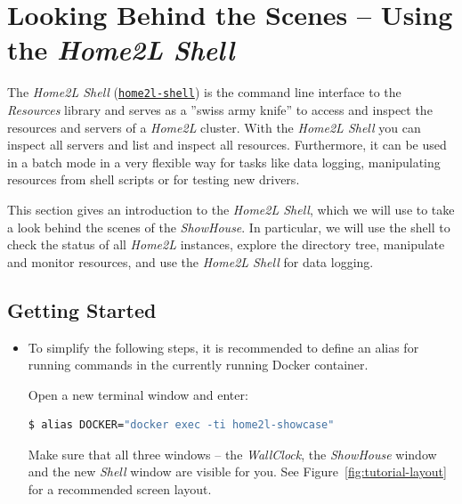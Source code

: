 \documentclass[12pt,english,parskip=half,headheight=19pt]{scrreprt}
\newcommand{\idx}[1]{#1\index{#1}}
\newcommand{\reftool}[1]{\hyperref[tool:#1]{\texttt{\idx{#1}}}}
\begin{document}
\clearpage
\section{Looking Behind the Scenes -- Using the \textit{Home2L Shell}}
\label{sec:tutorial-shell}


The \textit{Home2L Shell} (\reftool{home2l-shell}) is the command line interface to the \textit{Resources} library and serves as a ''swiss army knife'' to access and inspect the resources and servers of a \textit{Home2L} cluster. With the \textit{Home2L Shell} you can inspect all servers and list and inspect all resources. Furthermore, it can be used in a batch mode in a very flexible way for tasks like data logging, manipulating resources from shell scripts or for testing new drivers.

This section gives an introduction to the \textit{Home2L Shell}, which we will use to take a look behind the scenes of the \textit{ShowHouse}. In particular, we will use the shell to check the status of all \textit{Home2L} instances, explore the directory tree, manipulate and monitor resources, and use the \textit{Home2L Shell} for data logging.





\subsection{Getting Started}
\label{sec:tutorial-shell-start}



\begin{itemize}[$\blacktriangleright$]

\item
  To simplify the following steps, it is recommended to define an alias for running
  commands in the currently running Docker container.
  
  Open a new terminal window and enter:
  \begin{lstlisting}[language=bash]
    $ alias DOCKER="docker exec -ti home2l-showcase"
  \end{lstlisting}
  Make sure that all three windows -- the \textit{WallClock}, the \textit{ShowHouse} window and 
  the new \textit{Shell} window are visible for you. See Figure~\ref{fig:tutorial-layout} for
  a recommended screen layout.

\end{itemize}
\end{document}
